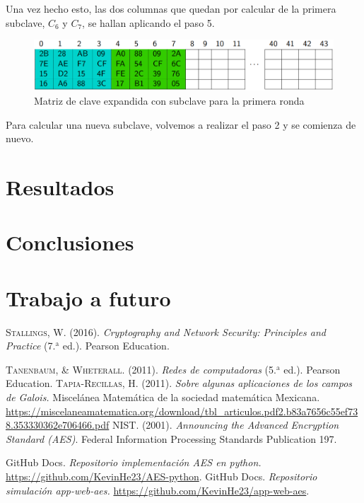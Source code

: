 \documentclass[peerreview]{IEEEtran}
\begin{document}
Una vez hecho esto, las dos columnas que quedan por calcular de la primera subclave, $C_6$ y $C_7$, se hallan aplicando el paso 5.
\begin{figure}[h]
	\includegraphics[scale=0.36]{figuras/clave_expandida2.png}
	\centering
	\caption{Matriz de clave expandida con subclave para la primera ronda}
	\label{fig:10}
\end{figure}

Para calcular una nueva subclave, volvemos a realizar el paso 2 y se comienza de nuevo.


\section{Resultados}
\section{Conclusiones}
\section{Trabajo a futuro}




\begin{thebibliography}{1}
   \textsc{Stallings, W.} (2016). \textit{Cryptography and Network
    Security: Principles and Practice} (7.$^{\text{a}}$ ed.). Pearson Education.

   \textsc{Tanenbaum, \& Wheterall.} (2011). \textit{Redes de
    computadoras} (5.$^{\text{a}}$ ed.). Pearson Education.
  \textsc{Tapia-Recillas, H.} (2011). \textit{Sobre algunas
    aplicaciones de los campos de Galois.} Miscelánea Matemática de la sociedad
  matemática Mexicana.
  \url{https://miscelaneamatematica.org/download/tbl_articulos.pdf2.b83a7656c55ef738.353330362e706466.pdf}
   \textsc{NIST}. (2001). \textit{Announcing the Advanced
    Encryption Standard (AES)}. Federal Information Processing Standards Publication
  197.

   GitHub Docs.\textit{ Repositorio implementación AES en python.}
  \url{https://github.com/KevinHe23/AES-python}.
    GitHub Docs.\textit{ Repositorio simulación app-web-aes.}
  \url{https://github.com/KevinHe23/app-web-aes}.
\end{thebibliography}
\end{document}
